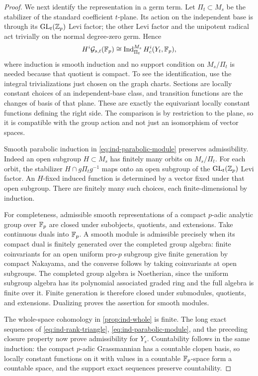 \begin{proof}
We next identify the representation in a germ term.  Let
$\Pi_t\subset M_s$ be the stabilizer of the standard
coefficient $t$-plane.  Its action on the independent base is
through its $\operatorname{GL}_t(\mathbb Z_p)$ Levi factor; the other Levi factor
and the unipotent radical act trivially on the normal
degree-zero germ.  Hence
\begin{equation}
 \label{eq:ind-parabolic-module}
 H^i\mathcal G_{s,t}(\mathbb F_p)
   \cong
 \operatorname{Ind}_{\Pi_t}^{M_s} H_c^i(Y_t,\mathbb F_p),
\end{equation}
where induction is smooth induction and no support condition
on $M_s/\Pi_t$ is needed because that quotient is compact.
To see the identification, use the integral trivializations
just chosen on the graph charts.  Sections are locally constant choices
of an independent-base class, and transition functions are
the changes of basis of that plane.  These are exactly the
equivariant locally constant functions defining the right
side.  The comparison is by restriction to the plane, so
it is compatible with the group action and not just an
isomorphism of vector spaces.

Smooth parabolic induction in \cref{eq:ind-parabolic-module}
preserves admissibility.  Indeed an open subgroup $H\subset
M_s$ has finitely many orbits on $M_s/\Pi_t$.  For each orbit,
the stabilizer $H\cap g\Pi_tg^{-1}$ maps onto an open
subgroup of the $\operatorname{GL}_t(\mathbb Z_p)$ Levi factor.  An $H$-fixed
induced function is determined by a vector fixed under that
open subgroup.  There are finitely many such choices, each
finite-dimensional by induction.

For completeness, admissible smooth representations of a
compact $p$-adic analytic group over $\mathbb F_p$ are closed under
subobjects, quotients, and extensions.  Take continuous
duals into $\mathbb F_p$.  A smooth module is admissible precisely
when its compact dual is finitely generated over the
completed group algebra: finite coinvariants for an open
uniform pro-$p$ subgroup give finite generation by compact
Nakayama, and the converse follows by taking coinvariants
at open subgroups.  The completed group algebra is
Noetherian, since the uniform subgroup algebra has its
polynomial associated graded ring and the full algebra is
finite over it.  Finite generation is therefore closed
under submodules, quotients, and extensions.  Dualizing
proves the assertion for smooth modules.

The whole-space cohomology in \cref{prop:ind-whole} is finite.
The long exact sequences of
\cref{eq:ind-rank-triangle}, \cref{eq:ind-parabolic-module},
and the preceding closure property now prove admissibility
for $Y_s$.  Countability follows in the same induction:
the compact $p$-adic Grassmannian has a countable clopen
basis, so locally constant functions on it with values in
a countable $\mathbb F_p$-space form a countable space, and the
support exact sequences preserve countability.

\end{proof}

